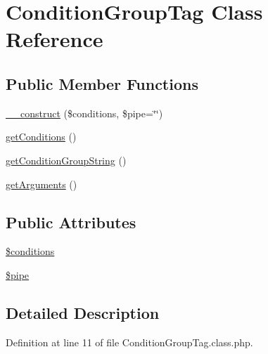 \hypertarget{classConditionGroupTag}{\section{Condition\-Group\-Tag Class Reference}
\label{classConditionGroupTag}
}
\subsection*{Public Member Functions}
\begin{DoxyCompactItemize}
\item 
\hyperlink{classConditionGroupTag_abe87b12e3a70141e056bda09b5db349f}{\-\_\-\-\_\-construct} (\$conditions, \$pipe=\char`\"{}\char`\"{})
\item 
\hyperlink{classConditionGroupTag_a7c73e801b9044cacf7bdfdcd718d4939}{get\-Conditions} ()
\item 
\hyperlink{classConditionGroupTag_a7bf3bb17f13f21b6c2765dced1638d85}{get\-Condition\-Group\-String} ()
\item 
\hyperlink{classConditionGroupTag_a39eb41f124f6a58e4afe873c2cb4ce6e}{get\-Arguments} ()
\end{DoxyCompactItemize}
\subsection*{Public Attributes}
\begin{DoxyCompactItemize}
\item 
\hyperlink{classConditionGroupTag_a19efbd0ebcee51dbec82581f0044fb1f}{\$conditions}
\item 
\hyperlink{classConditionGroupTag_af3040978080a9af0e9f8760eb05cc58b}{\$pipe}
\end{DoxyCompactItemize}


\subsection{Detailed Description}


Definition at line 11 of file Condition\-Group\-Tag.\-class.\-php.



